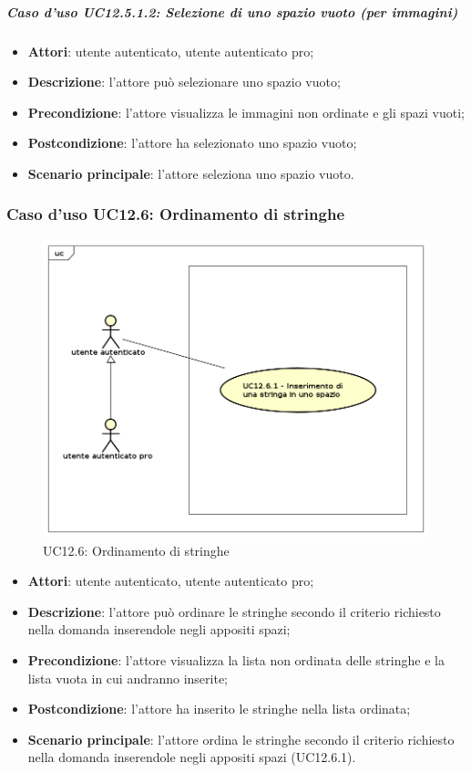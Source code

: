 \subparagraph{Caso d'uso UC12.5.1.2: Selezione di uno spazio vuoto (per immagini)}
\begin{itemize}
\item \textbf{Attori}: utente autenticato, utente autenticato pro;
\item \textbf{Descrizione}: l'attore può selezionare uno spazio vuoto;
\item \textbf{Precondizione}: l'attore visualizza le immagini non ordinate e gli spazi vuoti;
\item \textbf{Postcondizione}: l'attore ha selezionato uno spazio vuoto;
\item \textbf{Scenario principale}: l'attore seleziona uno spazio vuoto.
\end{itemize}

\subsubsection{Caso d'uso UC12.6: Ordinamento di stringhe}
\begin{figure}[h]
	\centering
	\includegraphics[scale=0.5]{UML/UC12_6.png}
	\caption{UC12.6: Ordinamento di stringhe}
\end{figure}
\begin{itemize}
\item \textbf{Attori}: utente autenticato, utente autenticato pro;
\item \textbf{Descrizione}: l'attore può ordinare le stringhe secondo il criterio richiesto nella domanda inserendole negli appositi spazi;
\item \textbf{Precondizione}: l'attore visualizza la lista non ordinata delle stringhe e la lista vuota in cui andranno inserite;
\item \textbf{Postcondizione}: l'attore ha inserito le stringhe nella lista ordinata;
\item \textbf{Scenario principale}: l'attore ordina le stringhe secondo il criterio richiesto nella domanda inserendole negli appositi spazi (UC12.6.1).
\end{itemize}

